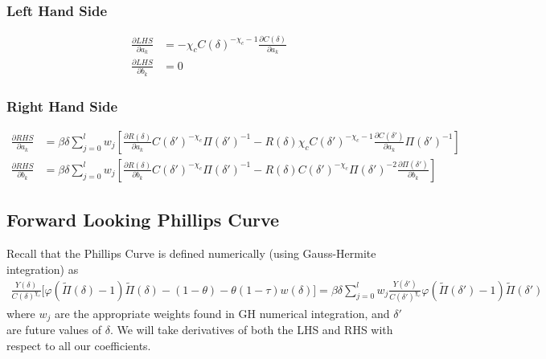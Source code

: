 \documentclass[11pt]{article}
\begin{document}
\subsubsection*{Left Hand Side}
\begin{align}
	\frac{\partial LHS}{\partial a_k} &= -\chi_cC(\delta)^{-\chi_c-1}\frac{\partial C(\delta)}{\partial a_k} \\
	\frac{\partial LHS}{\partial b_k} &= 0
\end{align}

\subsubsection*{Right Hand Side}
\begin{align}
\frac{\partial RHS}{\partial a_k} &= \beta\delta\sum_{j = 0}^{l}w_j\left[\frac{\partial R(\delta)}{\partial a_k} C(\delta')^{-\chi_{c}}\Pi(\delta')^{-1} - R(\delta)\chi_{c}C(\delta')^{-\chi_{c}-1}\frac{\partial C(\delta')}{\partial a_k}\Pi(\delta')^{-1}\right] \\
\frac{\partial RHS}{\partial b_k} &=  \beta\delta\sum_{j = 0}^{l}w_j\left[\frac{\partial R(\delta)}{\partial b_k} C(\delta')^{-\chi_{c}}\Pi(\delta')^{-1} - R(\delta)C(\delta')^{-\chi_{c}}\Pi(\delta')^{-2}\frac{\partial \Pi(\delta')}{\partial b_k}\right] 
\end{align}

\subsection*{Forward Looking Phillips Curve}
\noindent 
Recall that the Phillips Curve is defined numerically (using Gauss-Hermite integration) as 
\begin{align}
\frac{Y(\delta)}{C(\delta)^{\chi_{c}}}\bigl[ \varphi (\tilde{\Pi}(\delta) - 1)\tilde{\Pi}(\delta) - (1 - \theta) - \theta (1-\tau)w(\delta)\bigr] =  \beta\delta\sum_{j = 0}^{l}w_j\frac{Y(\delta')}{C(\delta')^{\chi_{c}}}\varphi (\tilde{\Pi}(\delta') - 1)\tilde{\Pi}(\delta')
\end{align}
where $w_j$ are the appropriate weights found in GH numerical integration, and $\delta'$ are future values of $\delta$. We will take derivatives of both the LHS and RHS with respect to all our coefficients.
\end{document}
